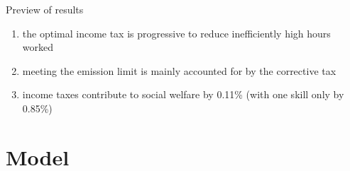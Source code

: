 \documentclass[11pt,aspectratio=169]{beamer}
\begin{document}
\begin{frame}{Preview of results}
	\pause
\begin{enumerate}
	\item<+-> the \alert{optimal income tax is progressive}  to reduce inefficiently high hours worked
	\vspace{5mm}
	\item<+->  meeting the emission limit is mainly accounted for by the corrective tax
	\vspace{5mm}
	\item<+-> income taxes contribute to social welfare by 0.11\%  \small{(with one skill only by 0.85\%)}  %
	
	\vspace{5mm}
\end{enumerate}
\end{frame}

\section{Model}

\end{document}
